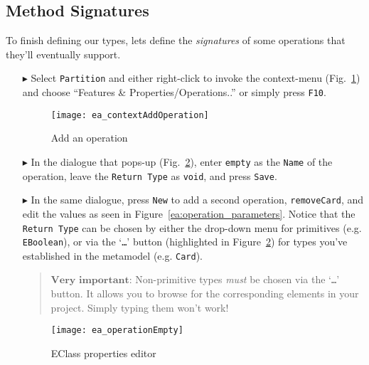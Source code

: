 \newpage
\subsection{Method Signatures}
\visHeader
\hypertarget{static:methods vis}{}

To finish defining our types, lets define the \emph{signatures} of some operations that they'll eventually support.

\begin{enumerate}

\item[$\blacktriangleright$] Select \texttt{Partition} and either right-click to invoke the context-menu (Fig.~\ref{ea:add_operation})  and choose ``Features \&
Properties/Operations..'' or simply press \texttt{F10}.

\begin{figure}[htbp]
	\centering
  \texttt{[image: ea\_contextAddOperation]}
	\caption{Add an operation}
	\label{ea:add_operation}
\end{figure}
\FloatBarrier

\item[$\blacktriangleright$] In the dialogue that pops-up (Fig.~\ref{ea:operation_properties}), enter \texttt{empty} as the \texttt{Name} of the operation,
leave the \texttt{Return Type} as \texttt{void}, and press \texttt{Save}. 

\vspace{0.5cm}

\item[$\blacktriangleright$] In the same dialogue, press \texttt{New} to add a second operation, \texttt{removeCard}, and edit the values as seen in 
Figure~\ref{ea:operation_parameters}. Notice that the \texttt{Return Type} can be chosen by either the drop-down menu for
primitives (e.g. \texttt{EBoolean}), or via the `\texttt{\ldots}' button (highlighted in Figure~\ref{ea:operation_properties}) for types you've established in
the metamodel (e.g. \texttt{Card}).
\vspace{-.3cm}
\begin{quote}
{ \small
$\textbf{Very important:}$ Non-primitive types \emph{must} be chosen via the `\texttt{\ldots}' button. It allows you to browse for the corresponding elements in
your project. Simply typing them won't work!
}
\end{quote}

\begin{figure}[htbp]
	\centering
  	\texttt{[image: ea\_operationEmpty]}
	\caption{EClass properties editor}
	\label{ea:operation_properties}
\end{figure}



\end{enumerate}
